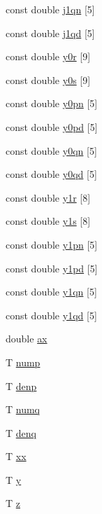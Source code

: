 \begin{DoxyCompactItemize}
const double \hyperlink{structLuna_1_1Bessel_a525e537373d5f47d498981215d270770}{j1qn} \mbox{[}5\mbox{]}
\item 
const double \hyperlink{structLuna_1_1Bessel_a28d43c510a489515508fdf18450a280c}{j1qd} \mbox{[}5\mbox{]}
\item 
const double \hyperlink{structLuna_1_1Bessel_a66915e7a2dd7ef9b2eee1600b272d7a9}{y0r} \mbox{[}9\mbox{]}
\item 
const double \hyperlink{structLuna_1_1Bessel_abff8e2375cf91f57fb3bb71a379f8c20}{y0s} \mbox{[}9\mbox{]}
\item 
const double \hyperlink{structLuna_1_1Bessel_a543af2a1841681067dd1f346819d47dc}{y0pn} \mbox{[}5\mbox{]}
\item 
const double \hyperlink{structLuna_1_1Bessel_aae034512aa17e9a7541b9df1eab88627}{y0pd} \mbox{[}5\mbox{]}
\item 
const double \hyperlink{structLuna_1_1Bessel_a1bcf2ab4b0bfdbf914cc33cb9f6f22be}{y0qn} \mbox{[}5\mbox{]}
\item 
const double \hyperlink{structLuna_1_1Bessel_acc0752d48d86fad96a06178f62fb9780}{y0qd} \mbox{[}5\mbox{]}
\item 
const double \hyperlink{structLuna_1_1Bessel_a558dbb69ececd5b2e46447709c99077e}{y1r} \mbox{[}8\mbox{]}
\item 
const double \hyperlink{structLuna_1_1Bessel_ac2eeeedc9437d9a3b78cd9e30ba2aa37}{y1s} \mbox{[}8\mbox{]}
\item 
const double \hyperlink{structLuna_1_1Bessel_af161635651020ba0c10099888ad348ac}{y1pn} \mbox{[}5\mbox{]}
\item 
const double \hyperlink{structLuna_1_1Bessel_a22637ff3011249c465d3970c92edc83e}{y1pd} \mbox{[}5\mbox{]}
\item 
const double \hyperlink{structLuna_1_1Bessel_ad1bcc14a49575518e9e8227621b39129}{y1qn} \mbox{[}5\mbox{]}
\item 
const double \hyperlink{structLuna_1_1Bessel_a69de10ab8f83dd702c5fbea8b2033e43}{y1qd} \mbox{[}5\mbox{]}
\item 
double \hyperlink{structLuna_1_1Bessel_ace7f3d0a3d4fcca01955bd95cdede89a}{ax}
\item 
T \hyperlink{structLuna_1_1Bessel_a01ee09f3e4275f102df4c3b83fad1776}{nump}
\item 
T \hyperlink{structLuna_1_1Bessel_a71fa71babc245cef7c0902591ed30fff}{denp}
\item 
T \hyperlink{structLuna_1_1Bessel_aa126082495f16ae7d353f0b0623c80b8}{numq}
\item 
T \hyperlink{structLuna_1_1Bessel_a76731982814bd931ae5e8eb725f22c85}{denq}
\item 
T \hyperlink{structLuna_1_1Bessel_a15736ca5396b6f1b87895da22654d522}{xx}
\item 
T \hyperlink{structLuna_1_1Bessel_ab054d5c26284b7736633c171cd2717fc}{y}
\item 
T \hyperlink{structLuna_1_1Bessel_a3ffa857b03c181b3e3ba7422124c60e1}{z}
\end{DoxyCompactItemize}


